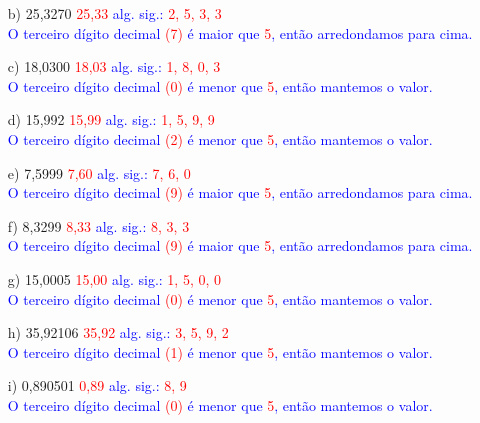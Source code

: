 \documentclass[a4paper, 12pt]{article}
\begin{document}
\begin{enumerate}
\begin{enumerate}[align=left, labelsep=-0.5em]
              \item[b)] 25,3270 \textcolor{red}{25,33} \textcolor{blue}{alg. sig.:} \textcolor{red}{2, 5, 3, 3} \\
                    \textcolor{blue}{O terceiro dígito decimal \textcolor{red}{(7)} é maior que \textcolor{red}{5}, então arredondamos para cima.}

              \item[c)] 18,0300 \textcolor{red}{18,03} \textcolor{blue}{alg. sig.:} \textcolor{red}{1, 8, 0, 3} \\
                    \textcolor{blue}{O terceiro dígito decimal \textcolor{red}{(0)} é menor que \textcolor{red}{5}, então mantemos o valor.}

              \item[d)] 15,992 \textcolor{red}{15,99} \textcolor{blue}{alg. sig.:} \textcolor{red}{1, 5, 9, 9} \\
                    \textcolor{blue}{O terceiro dígito decimal \textcolor{red}{(2)} é menor que \textcolor{red}{5}, então mantemos o valor.}

              \item[e)] 7,5999 \textcolor{red}{7,60} \textcolor{blue}{alg. sig.:} \textcolor{red}{7, 6, 0} \\
                    \textcolor{blue}{O terceiro dígito decimal \textcolor{red}{(9)} é maior que \textcolor{red}{5}, então arredondamos para cima.}

              \item[f)] 8,3299 \textcolor{red}{8,33} \textcolor{blue}{alg. sig.:} \textcolor{red}{8, 3, 3} \\
                    \textcolor{blue}{O terceiro dígito decimal \textcolor{red}{(9)} é maior que \textcolor{red}{5}, então arredondamos para cima.}

              \item[g)] 15,0005  \textcolor{red}{15,00} \textcolor{blue}{alg. sig.:} \textcolor{red}{1, 5, 0, 0} \\
                    \textcolor{blue}{O terceiro dígito decimal \textcolor{red}{(0)} é menor que \textcolor{red}{5}, então mantemos o valor.}

              \item[h)] 35,92106 \textcolor{red}{35,92} \textcolor{blue}{alg. sig.:} \textcolor{red}{3, 5, 9, 2} \\
                    \textcolor{blue}{O terceiro dígito decimal \textcolor{red}{(1)} é menor que \textcolor{red}{5}, então mantemos o valor.}

              \item[i)] 0,890501 \textcolor{red}{0,89} \textcolor{blue}{alg. sig.:} \textcolor{red}{8, 9} \\
                    \textcolor{blue}{O terceiro dígito decimal \textcolor{red}{(0)} é menor que \textcolor{red}{5}, então mantemos o valor.}
          \end{enumerate}
\end{enumerate}
\end{document}
